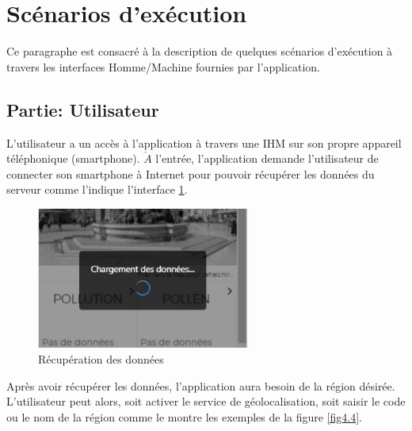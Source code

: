 \section{Scénarios d'exécution}

\qquad Ce paragraphe est consacré à la description de quelques scénarios d'exécution à travers les interfaces Homme/Machine fournies par l'application.

\subsection{Partie: Utilisateur}

\qquad L'utilisateur a un accès à l'application à travers une IHM sur son propre appareil téléphonique (smartphone). $\grave{A}$ l'entrée, l'application demande l'utilisateur de connecter son smartphone à Internet pour pouvoir récupérer les données du serveur comme l'indique l'interface \ref{fig4.3}.

\begin{figure}[!h]
	\begin{center}
 		\includegraphics[width=7cm]{figures/Capture1}
 	\end{center}
 	\caption{Récupération des données}
 	\label{fig4.3}
\end{figure}
\newpage
Après avoir récupérer les données, l'application aura besoin de la région désirée. L'utilisateur peut alors, soit activer le service de géolocalisation, soit saisir le code ou le nom de la région comme le montre les exemples de la figure \ref{fig4.4}.

